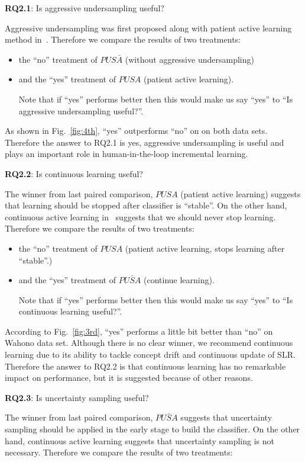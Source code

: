 \documentclass{svjour3}
\theoremstyle{break}
\begin{document}
\textbf{RQ2.1}: Is aggressive undersampling useful?

Aggressive undersampling was first proposed along with patient active learning method in~\cite{wallace2010semi}. Therefore we compare the results of two treatments:
\begin{itemize}
\item the ``no'' treatment of $PUS\bar{A}$ (without aggressive undersampling)
\item and the ``yes'' treatment of $PUSA$ (patient active learning). 

Note that if ``yes''
performs better then this would make us say ``yes'' to ``Is aggressive undersampling useful?''.
\end{itemize}
As shown in Fig.~\ref{fig:4th}, ``yes'' outperforms ``no'' on on both data sets. Therefore the answer to RQ2.1 is yes, aggressive undersampling is useful and plays an important role in human-in-the-loop incremental learning.

\textbf{RQ2.2}: Is continuous learning useful?

The winner from last paired comparison, $PUSA$ (patient active learning) suggests that learning should be stopped after classifier is ``stable''. On the other hand, continuous active learning in~\cite{cormack2014evaluation} suggests that we should never stop learning. Therefore we compare the results of two treatments:

\begin{itemize}
\item the ``no'' treatment of $PUSA$ (patient active learning, stops learning after ``stable''.)
\item and the ``yes'' treatment of $PU\bar{S}A$ (continue learning). 

Note that if ``yes''
performs better then this would make us say ``yes'' to ``Is continuous learning useful?''.
\end{itemize}

According to Fig.~\ref{fig:3rd}, ``yes'' performs a little bit better than ``no'' on Wahono data set. Although there is no clear winner, we recommend continuous learning due to its ability to tackle concept drift and continuous update of SLR. Therefore the answer to RQ2.2 is that continuous learning has no remarkable impact on performance, but it is suggested because of other reasons.

\textbf{RQ2.3}: Is uncertainty sampling useful?

The winner from last paired comparison, $PU\bar{S}A$ suggests that uncertainty sampling should be applied in the early stage to build the classifier. On the other hand, continuous active learning suggests that uncertainty sampling is not necessary. Therefore we compare the results of two treatments:
\end{document}

